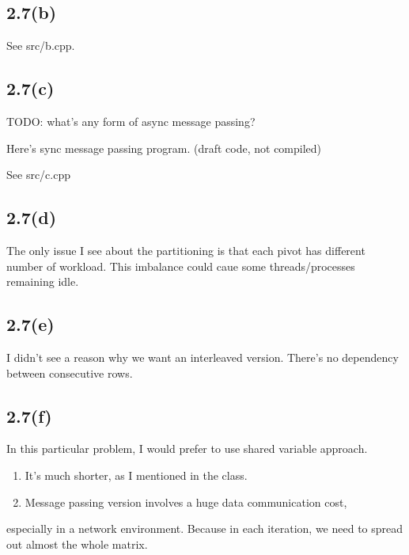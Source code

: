 \subsection{2.7(b)}

%
See src/b.cpp. 

\subsection{2.7(c)}

TODO: what's any form of async message passing?

Here's sync message passing program. (draft code, not compiled) 

%
See src/c.cpp

\subsection{2.7(d)}

The only issue I see about the partitioning is that each pivot has different number of workload.
This imbalance could caue some threads/processes remaining idle. 

\subsection{2.7(e)}
I didn't see a reason why we want an interleaved version. 
There's no dependency between consecutive rows.

\subsection{2.7(f)} 
In this particular problem, I would prefer to use shared variable approach. 
\begin{enumerate}
\item It's much shorter, as I mentioned in the class.
\item Message passing version involves a huge data communication cost, 
\end{enumerate} 
especially in a network environment. 
Because in each iteration, we need to spread out almost the whole matrix. 
